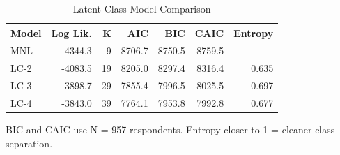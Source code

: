 \begin{table}[!h]
\centering
\caption{Latent Class Model Comparison}
\centering
\begin{threeparttable}
\begin{tabular}[t]{lrrrrrr}
\toprule
Model & Log Lik. & K & AIC & BIC & CAIC & Entropy\\
\midrule
MNL & -4344.3 & 9 & 8706.7 & 8750.5 & 8759.5 & --\\
LC-2 & -4083.5 & 19 & 8205.0 & 8297.4 & 8316.4 & 0.635\\
LC-3 & -3898.7 & 29 & 7855.4 & 7996.5 & 8025.5 & 0.697\\
LC-4 & -3843.0 & 39 & 7764.1 & 7953.8 & 7992.8 & 0.677\\
\bottomrule
\end{tabular}
\begin{tablenotes}
\item BIC and CAIC use N = 957 respondents. Entropy closer to 1 = cleaner class separation.
\end{tablenotes}
\end{threeparttable}
\end{table}

